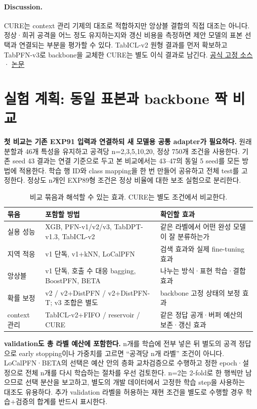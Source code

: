 \paragraph{Discussion.}
CURE는 context 관리 기제의 대조로 적합하지만 앙상블 결합의 직접 대조는 아니다. 정상·희귀 공격을 어느 정도 유지하는지와 갱신 비용을 측정하면 제안 모델의 표본 선택과 연결되는 부분을 평가할 수 있다. TabICL-v2 원형 결과를 먼저 확보하고 TabPFN-v3로 backbone을 교체한 CURE는 별도 이식 결과로 남긴다.
\href{https://github.com/morcellinus/CURE-ICML-FMSD/tree/f7c6b2f3c172ce3576f6c208a25c9655de2ea7e2}{공식 고정 소스} · \href{https://arxiv.org/abs/2606.18677}{논문}

\section{실험 계획: 동일 표본과 backbone 짝 비교}
\textbf{첫 비교는 기존 EXP91 입력과 연결하되 새 모델용 공통 adapter가 필요하다.} 원래 분할과 46개 특성을 유지하고 공격당 n=2,3,5,10,20, 정상 750개 조건을 사용한다. 기존 seed 43 결과는 연결 기준으로 두고 본 비교에서는 43--47의 동일 5 seed를 모든 방법에 적용한다. 학습 행 ID와 class mapping을 한 번 만들어 공유하고 전체 test를 고정한다. 정상도 n개인 EXP89형 조건은 정상 비율에 대한 보조 실험으로 분리한다.

\begin{table}[H]\centering\small
\caption{비교 묶음과 해석할 수 있는 효과. CURE는 별도 조건에서 비교한다.}
\begin{tabularx}{\linewidth}{p{.20\linewidth}YY}\toprule
묶음 & 포함할 방법 & 확인할 효과\\\midrule
실용 성능 & XGB, PFN-v1/v2/v3, TabDPT-v1.3, TabICL-v2 & 같은 라벨에서 어떤 완성 모델이 잘 분류하는가\\
지역 적응 & v1 단독, v1+kNN, LoCalPFN & 검색 효과와 실제 fine-tuning 효과\\
앙상블 & v1 단독, 호출 수 대응 bagging, BoostPFN, BETA & 나누는 방식·표현 학습·결합 효과\\
확률 보정 & v2 / v2+DistPFN / v2+DistPFN-T; v3 조합은 별도 & backbone 고정 상태의 보정 효과\\
context 관리 & TabICL-v2+FIFO / reservoir / CURE & 같은 정답 공개·버퍼 예산의 보존·갱신 효과\\\bottomrule
\end{tabularx}
\end{table}

\textbf{validation도 총 라벨 예산에 포함한다.} n개를 학습에 전부 넣은 뒤 별도의 공격 정답으로 early stopping이나 가중치를 고르면 ``공격당 n개 라벨'' 조건이 아니다. LoCalPFN·BETA의 선택은 예산 안의 층화 교차검증으로 수행하고 정한 epoch·설정으로 전체 n개를 다시 학습하는 절차를 우선 검토한다. n=2는 2-fold로 한 행씩만 남으므로 선택 분산을 보고하고, 별도의 개발 데이터에서 고정한 학습 step을 사용하는 대조도 유용하다. 추가 validation 라벨을 허용하는 재현 조건을 별도로 수행할 경우 학습+검증의 합계를 반드시 표시한다.


